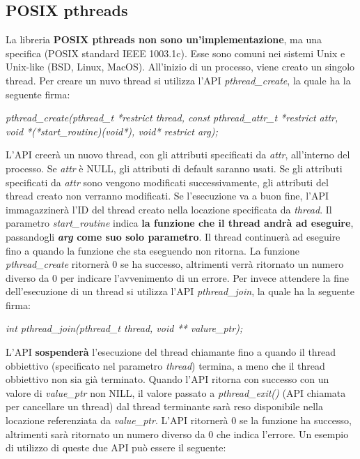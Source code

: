 \documentclass[12pt]{article}
\begin{document}
\subsection{POSIX pthreads}
La libreria \textbf{POSIX pthreads non sono un'implementazione}, ma una specifica (POSIX standard IEEE 1003.1c).
Esse sono comuni nei sistemi Unix e Unix-like (BSD, Linux, MacOS).
All'inizio di un processo, viene creato un singolo thread.
Per creare un nuvo thread si utilizza l'API \textit{pthread\_create}, la quale ha la seguente firma:
\begin{center}
    \textit{pthread\_create(pthread\_t *restrict thread, const pthread\_attr\_t *restrict attr, void *(*start\_routine)(void*), void* restrict arg);}
\end{center}
L'API creerà un nuovo thread, con gli attributi specificati da \textit{attr}, all'interno del processo.
Se \textit{attr} è NULL, gli attributi di default saranno usati. Se gli attributi specificati da \textit{attr} sono vengono modificati successivamente, gli attributi
del thread creato non verranno modificati. Se l'esecuzione va a buon fine, l'API immagazzinerà l'ID del thread creato nella locazione specificata da \textit{thread}.
Il parametro \textit{start\_routine} indica \textbf{la funzione che il thread andrà ad eseguire}, passandogli \textbf{\textit{arg} come suo solo parametro}. Il thread continuerà ad eseguire fino a quando la funzione che sta eseguendo
non ritorna. La funzione \textit{pthread\_create} ritornerà 0 se ha successo, altrimenti verrà ritornato un numero diverso da 0 per indicare l'avvenimento di un errore.
Per invece attendere la fine dell'esecuzione di un thread si utilizza l'API \textit{pthread\_join}, la quale ha la seguente firma:
\begin{center}
    \textit{int pthread\_join(pthread\_t thread, void ** valure\_ptr);}
\end{center}
L'API \textbf{sospenderà} l'esecuzione del thread chiamante fino a quando il thread obbiettivo (specificato nel parametro \textit{thread}) termina, a meno che il thread obbiettivo non sia già terminato.
Quando l'API ritorna con successo con un valore di \textit{value\_ptr} non NILL, il valore passato a \textit{pthread\_exit()} (API chiamata per cancellare un thread) dal thread terminante sarà reso disponibile
nella locazione referenziata da \textit{value\_ptr}.
L'API ritornerà 0 se la funzione ha successo, altrimenti sarà ritornato un numero diverso da 0 che indica l'errore.
Un esempio di utilizzo di queste due API può essere il seguente:
\end{document}
